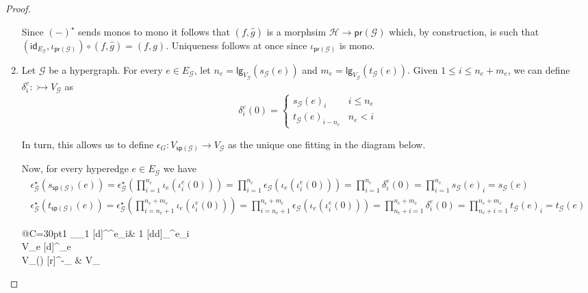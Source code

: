 \documentclass[3p]{elsarticle}
\newcommand{\lgh}{\mathsf{lg}}
\renewcommand{\sp}{\mathsf{sp}}
\newcommand{\pr}{\mathsf{pr}}
\newcommand{\mto}{\rightarrowtail}
\newcommand{\id}[1]{\mathsf{id}_{#1}}
\theoremstyle{remark}
\theoremstyle{definition}
\begin{document}
\begin{proof}
\begin{enumerate}
 Since $(-)^\star$ sends monos to mono it follows that $(f, \hat{g})$ is a morphsim $\mathcal{H}\to \pr(\mathcal{G}) $ which, by construction, is such that $(\id{E_{\mathcal{G}}}, \iota_{\pr(\mathcal{G})})\circ (f, \hat{g}) = (f,g)$.
  Uniqueness follows at once since $\iota_{\pr(\mathcal{G})}$ is mono.
 
\item Let $\mathcal{G}$ be a hypergraph. For every $e\in E_{\mathcal{G}}$, let $n_e=\lgh_{V_{\mathcal{G}}}(s_{\mathcal{G}}(e))$ and $m_e=\lgh_{V_{\mathcal{G}}}(t_{\mathcal{G}}(e))$. Given $1\leq i\leq n_e+m_e$,  we can define $\delta^e_i\colon \mto V_{\mathcal{G}}$ as
\[\delta^e_i(0) =\begin{cases}
	s_{\mathcal{G}}(e)_i & i\leq n_e\\
	t_{\mathcal{G}}(e)_{i-n_e} &  n_e < i
\end{cases}\]

In turn, this allows us to define $\epsilon_{G}\colon V_{\sp(\mathcal{G})}\to V_{\mathcal{G}}$ as the unique one fitting in the diagram below.

\noindent 
\begin{minipage}[l]{.8\linewidth}
	\setlength{\parindent}{1.5em}
	Now, for every hyperedge $e\in E_{\mathcal{G}}$ we have
	\begin{gather*}
		\epsilon_{\mathcal{G}}^\star(s_{\sp(\mathcal{G})}(e)) = \epsilon_{\mathcal{G}}^\star(\prod_{i=1}^{n_e} \iota_e(\iota^e_{i}(0)))=\prod_{i=1}^{n_e} \epsilon_{\mathcal{G}}(\iota_e(\iota^e_{i}(0)))=\prod_{i=1}^{n_e} \delta^e_i(0) =\prod_{i=1}^{n_e} s_{\mathcal{G}}(e)_i=   s_{\mathcal{G}}(e)\\
		\epsilon_{\mathcal{G}}^\star(t_{\sp(\mathcal{G})}(e)) = \epsilon_{\mathcal{G}}^\star(\prod_{i=n_e+1}^{n_e + m_e} \iota_e(\iota^e_{i}(0)))=\prod_{i=n_e+1}^{n_e + m_e} \epsilon_{\mathcal{G}}(\iota_e(\iota^e_{i}(0)))=\prod_{n_e+i=1}^{n_e + m_e} \delta^e_i(0) = \prod_{n_e+i=1}^{n_e + m_e}  t_{\mathcal{G}}(e)_i  = t_{\mathcal{G}}(e)
	\end{gather*} 
\end{minipage}
\hfill
\begin{minipage}[r]{.3\linewidth} \vspace{-.9cm}
	\xymatrix@R=10pt@C=30pt{1 \ar[r]_{\id{1}} \ar@{>->}[d]^{\iota^e_i}& 1 \ar@{>->}[dd]_{\delta^e_i}\\ V_e \ar@{>->}[d]^{\iota_e}  \\ V_{\sp()} ^-{\epsilon_{}} &  V_{}}
\end{minipage}


\end{enumerate}
\end{proof}
\end{document}
